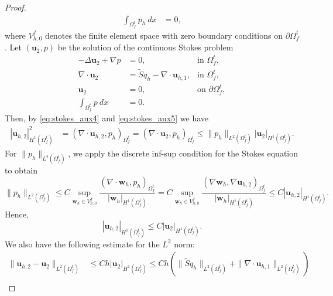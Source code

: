 \documentclass{article}
\newcommand{\bu}{{\mathbf{u}}}
\begin{document}
\begin{proof}
\begin{equation}
\begin{aligned}
            \int_{\Omega_f^t} p_h \ dx &= 0,
        \end{aligned}
    \end{equation}
    where $V_{h,0}^f$ denotes the finite element space with zero boundary conditions on $\partial\Omega_f^t$. Let $(\bu_2,p)$ be the solution of the continuous Stokes problem
    \begin{equation}\label{eq:stokes_aux5}
        \begin{aligned}
            -\Delta \bu_2 + \nabla p &= 0, &\text{in }\Omega_f^t,\\
            \nabla\cdot\bu_2 &= \tilde{S}q_h - \nabla\cdot\bu_{h,1}, &\text{in }\Omega_f^t,\\
            \bu_2 &= 0, &\text{on }\partial\Omega_f^t,\\
            \int_{\Omega_f^t} p \ dx &= 0.
        \end{aligned}
    \end{equation}
    Then, by \eqref{eq:stokes_aux4} and \eqref{eq:stokes_aux5} we have 
    \begin{equation}
        \begin{aligned}
            |\bu_{h,2}|_{H^1(\Omega_f^t)}^2 &= (\nabla\cdot\bu_{h,2},p_h)_{\Omega_f^t} = (\nabla\cdot\bu_{2},p_h)_{\Omega_f^t}\leq \|p_h\|_{L^2(\Omega_f^t)}|\bu_{2}|_{H^{1}(\Omega_f^t)}.
        \end{aligned}
    \end{equation}
    For $\|p_h\|_{L^2(\Omega_f^t)}$, we apply the discrete inf-sup condition for the Stokes equation to obtain
    \begin{equation}
        \|p_h\|_{L^2(\Omega_f^t)}\leq C\sup_{\mathbf{w}_h\in V_{h,0}^f}\frac{(\nabla\cdot\mathbf{w}_h,p_h)_{\Omega_f^t}}{|\mathbf{w}_h|_{H^1(\Omega_f^t)}} = C\sup_{\mathbf{w}_h\in V_{h,0}^f}\frac{(\nabla\mathbf{w}_h,\nabla\bu_{h,2})_{\Omega_f^t}}{|\mathbf{w}_h|_{H^1(\Omega_f^t)}} \leq C|\bu_{h,2}|_{H^1(\Omega_f^t)}.
    \end{equation}
    Hence,
    \begin{equation}
        |\bu_{h,2}|_{H^1(\Omega_f^t)} \leq C|\bu_{2}|_{H^1(\Omega_f^t)}.
    \end{equation}
    We also have the following estimate for the $L^2$ norm:
    \begin{equation}
        \begin{aligned}
        \|\bu_{h,2} - \bu_2\|_{L^2(\Omega_f^t)} &\leq Ch|\bu_2|_{H^1(\Omega_f^t)} \leq Ch(\|\tilde{S}q_h\|_{L^2(\Omega_f^t)} + \|\nabla\cdot\bu_{h,1}\|_{L^2(\Omega_f^t)}) \\

\end{aligned}
\end{equation}
\end{proof}
\end{document}
